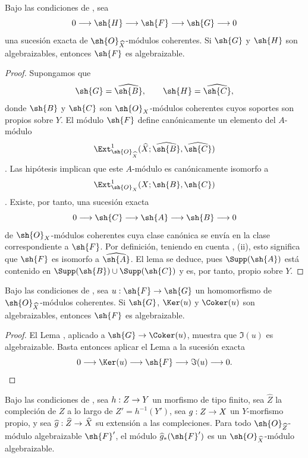 \documentclass[oneside]{amsart}
\makeatletter
\newcommand{\ega@arrow}[2]{\mathchoice{#1}{#2}{#2}{#2}}
\renewcommand{\to}{\ega@arrow{\longrightarrow}{\rightarrow}}
\let\EGAOriginalLabel\label
\renewcommand{\label}[1]{\phantomsection\EGAOriginalLabel{#1}}
\makeatother
\begin{document}
\begin{lemma}[5.3.1]
\label{III.5.3.1}
Bajo las condiciones de , sea
\[
  0\longrightarrow\sh{H}\longrightarrow\sh{F}
  \longrightarrow\sh{G}\longrightarrow0
\]
una sucesión exacta de $\sh{O}_{\widehat{X}}$-módulos coherentes.
Si $\sh{G}$ y $\sh{H}$ son algebraizables, entonces $\sh{F}$ es
algebraizable.
\end{lemma}

\begin{proof}
Supongamos que
\[
  \sh{G}=\widehat{\sh{B}},
  \qquad
  \sh{H}=\widehat{\sh{C}},
\]
donde $\sh{B}$ y $\sh{C}$ son $\sh{O}_X$-módulos coherentes cuyos
soportes son propios sobre $Y$. El módulo $\sh{F}$ define canónicamente
un elemento del $A$-módulo
\[
  \Ext^1_{\sh{O}_{\widehat{X}}}
  (\widehat{X};\widehat{\sh{B}},\widehat{\sh{C}})
\]
. Las hipótesis implican que este $A$-módulo es
canónicamente isomorfo a
\[
  \Ext^1_{\sh{O}_X}(X;\sh{B},\sh{C})
\]
. Existe, por tanto, una sucesión exacta
\[
  0\longrightarrow\sh{C}\longrightarrow\sh{A}
  \longrightarrow\sh{B}\longrightarrow0
\]
de $\sh{O}_X$-módulos coherentes cuya clase canónica se envía en la
clase correspondiente a $\sh{F}$. Por definición, teniendo en cuenta
, (ii), esto significa que $\sh{F}$ es isomorfo a
$\widehat{\sh{A}}$. El lema se deduce, pues
$\Supp(\sh{A})$ está contenido en
$\Supp(\sh{B})\cup\Supp(\sh{C})$ y es, por tanto, propio sobre $Y$.
\end{proof}

\begin{corollary}[5.3.2]
\label{III.5.3.2}
Bajo las condiciones de , sea
$u:\sh{F}\to\sh{G}$ un homomorfismo de
$\sh{O}_{\widehat{X}}$-módulos coherentes. Si $\sh{G}$, $\Ker(u)$ y
$\Coker(u)$ son algebraizables, entonces $\sh{F}$ es algebraizable.
\end{corollary}

\begin{proof}
El Lema , aplicado a
$\sh{G}\to\Coker(u)$, muestra que $\Im(u)$ es algebraizable. Basta entonces
aplicar el Lema  a la sucesión exacta
\[
  0\longrightarrow\Ker(u)\longrightarrow\sh{F}
  \longrightarrow\Im(u)\longrightarrow0.
\]
\end{proof}

\begin{lemma}[5.3.3]
\label{III.5.3.3}
Bajo las condiciones de , sea $h:Z\to Y$ un
morfismo de tipo finito, sea $\widehat{Z}$ la compleción de $Z$
a lo largo de $Z'=h^{-1}(Y')$, sea $g:Z\to X$ un $Y$-morfismo propio,
y sea $\widehat{g}:\widehat{Z}\to\widehat{X}$ su extensión a
las compleciones. Para todo $\sh{O}_{\widehat{Z}}$-módulo
algebraizable $\sh{F}'$, el módulo
$\widehat{g}_*(\sh{F}')$ es un
$\sh{O}_{\widehat{X}}$-módulo algebraizable.
\end{lemma}
\end{document}
